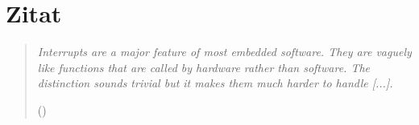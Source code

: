 \chapter*{Zitat}
\label{cha:Zitat}

\thispagestyle{empty}

\begin{center}
\begin{minipage}{14cm}
\begin{verse}
\textit{\glqq{}Interrupts are a major feature of most embedded software. They are vaguely like functions
	that are called by hardware rather than software. The distinction sounds trivial but it makes
	them much harder to handle [...].\grqq{}}

()
\end{verse}
\end{minipage}
\end{center}
